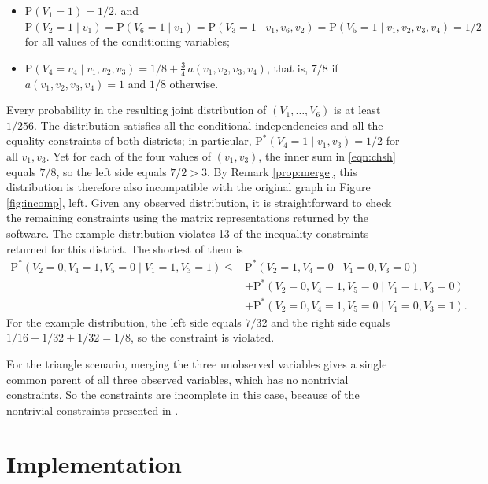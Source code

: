 \documentclass[12pt]{article}
\def\Pr{{\mathrm{P}}}
\def\Pdo{{\mathrm{P}^*}}
\begin{document}
\begin{itemize}
    \item $\Pr(V_1 = 1) = 1/2$, and $\Pr(V_2 = 1 \mid v_1) = \Pr(V_6 = 1 \mid v_1) = \Pr(V_3 = 1 \mid v_1, v_6, v_2) = \Pr(V_5 = 1 \mid v_1, v_2, v_3, v_4) = 1/2$ for all values of the conditioning variables;
    \item $\Pr(V_4 = v_4 \mid v_1, v_2, v_3) = 1/8 + \frac{3}{4}\, a(v_1, v_2, v_3, v_4)$, that is, $7/8$ if $a(v_1, v_2, v_3, v_4) = 1$ and $1/8$ otherwise.
\end{itemize}
Every probability in the resulting joint distribution of $(V_1, \ldots, V_6)$ is at least $1/256$. The distribution satisfies all the conditional independencies and all the equality constraints of both districts; in particular, $\Pdo(V_4 = 1 \mid v_1, v_3) = 1/2$ for all $v_1, v_3$. Yet for each of the four values of $(v_1, v_3)$, the inner sum in \eqref{eqn:chsh} equals $7/8$, so the left side equals $7/2 > 3$. By Remark \ref{prop:merge}, this distribution is therefore also incompatible with the original graph in Figure \ref{fig:incomp}, left. Given any observed distribution, it is straightforward to check the remaining constraints using the matrix representations returned by the software. The example distribution violates 13 of the inequality constraints returned for this district. The shortest of them is
\begin{align*}
\Pdo(V_2 = 0, V_4 = 1, V_5 = 0 \mid V_1 = 1, V_3 = 1) \leq{} & \Pdo(V_2 = 1, V_4 = 0 \mid V_1 = 0, V_3 = 0) \\
& + \Pdo(V_2 = 0, V_4 = 1, V_5 = 0 \mid V_1 = 1, V_3 = 0) \\
& + \Pdo(V_2 = 0, V_4 = 1, V_5 = 0 \mid V_1 = 0, V_3 = 1).
\end{align*}
For the example distribution, the left side equals $7/32$ and the right side equals $1/16 + 1/32 + 1/32 = 1/8$, so the constraint is violated.

For the triangle scenario, merging the three unobserved variables gives a single common parent of all three observed variables, which has no nontrivial constraints. So the constraints are incomplete in this case, because of the nontrivial constraints presented in \citet{Wolfe_2019}.




\section{Implementation} \label{sec:software}
\end{document}
